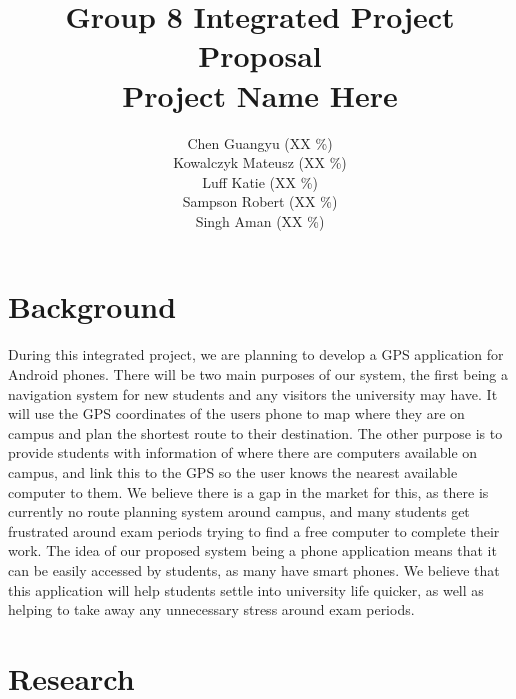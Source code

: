 \documentclass[10pt,a4paper,oneside]{report}
\begin{document}
\title{Group 8 Integrated Project Proposal\\Project Name Here}

\author{
  Chen Guangyu (XX \%)\\
  Kowalczyk Mateusz (XX \%)\\
  Luff Katie (XX \%)\\
  Sampson Robert (XX \%)\\
  Singh Aman (XX \%)\\ }
\maketitle
\section*{Background}
During this integrated project, we are planning to develop a GPS application for Android phones. There will be two main purposes of our system, the first being a navigation system for new students and any visitors the university may have. It will use the GPS coordinates of the users phone to map where they are on campus and plan the shortest route to their destination. The other purpose is to provide students with information of where there are computers available on campus, and link this to the GPS so the user knows the nearest available computer to them.
We believe there is a gap in the market for this, as there is currently no route planning system around campus, and many students get frustrated around exam periods trying to find a free computer to complete their work. The idea of our proposed system being a phone application means that it can be easily accessed by students, as many have smart phones. We believe that this application will help students settle into university life quicker, as well as helping to take away any unnecessary stress around exam periods.

\section*{Research}
\end{document}
